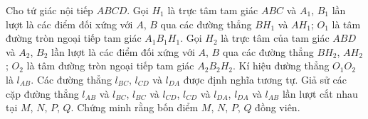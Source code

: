\begin{ex}%
	Cho tứ giác nội tiếp $ABCD$. Gọi $H_1$ là trực tâm tam giác $ABC$ và $A_1$, $B_1$ lần lượt là các điểm đối xứng với $A$, $B$ qua các đường thẳng $BH_1$ và $AH_1$; $O_1$ là tâm đường tròn ngoại tiếp tam giác $A_1B_1H_1$. Gọi $H_2$ là trực tâm của tam giác $ABD$ và $A_2$, $B_2$ lần lượt là các điểm đối xứng với $A$, $B$ qua các đường thẳng $BH_2$, $AH_2$; $O_2$ là tâm đường tròn ngoại tiếp tam giác $A_2B_2H_2$. Kí hiệu đường thẳng $O_1O_2$ là $l_{AB}$. Các đường thẳng $l_{BC}$, $l_{CD}$ và $l_{DA}$ được định nghĩa tương tự. Giả sử các cặp đường thẳng $l_{AB}$ và $l_{BC}$, $l_{BC}$ và $l_{CD}$, $l_{CD}$ và $l_{DA}$, $l_{DA}$ và $l_{AB}$ lần lượt cắt nhau tại $M$, $N$, $P$, $Q$. Chứng minh rằng bốn điểm $M$, $N$, $P$, $Q$ đồng viên.
\end{ex}
